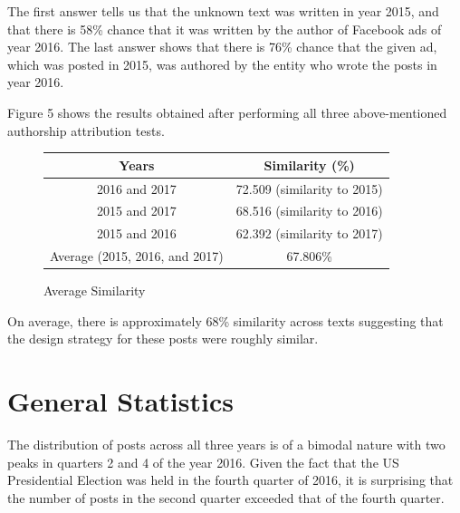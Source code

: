 \documentclass{article}
\begin{document}
The first answer tells us that the unknown text was written in year 2015, and
that there is 58\% chance that it was written by the author of Facebook ads of
year 2016. The last answer shows that there is 76\% chance that the given ad,
which was posted in 2015, was authored by the entity who wrote the posts in
year 2016.

\bigskip

Figure 5 shows the results obtained after performing all three above-mentioned
authorship attribution tests.

\begin{figure}[H]
  \centering
  \begin{tabular}{*{2}{c}}
    \toprule
    Years & Similarity (\%)\\
    \midrule
    2016 and 2017 & 72.509 (similarity to 2015)\\
    \midrule
    2015 and 2017 & 68.516 (similarity to 2016)\\
    \midrule
    2015 and 2016 & 62.392 (similarity to 2017)\\
    \midrule
    Average (2015, 2016, and 2017) & 67.806\%\\
    \bottomrule
  \end{tabular}
  \caption{Average Similarity}
\end{figure}

On average, there is approximately 68\% similarity across texts suggesting that
the design strategy for these posts were roughly similar.


\section*{\centering General Statistics}

The distribution of posts across all three years is of a bimodal nature with
two peaks in quarters 2 and 4 of the year 2016. Given the fact that the US
Presidential Election was held in the fourth quarter of 2016, it is surprising
that the number of posts in the second quarter exceeded that of the fourth
quarter.
\end{document}
